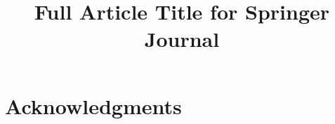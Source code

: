 \documentclass[pdflatex,sn-mathphys-num]{sn-jnl}
\begin{document}
\title[Article Title]{Full Article Title for Springer Journal}


\abstract{}


\maketitle






\section*{Acknowledgments}



\appendix

\end{document}
